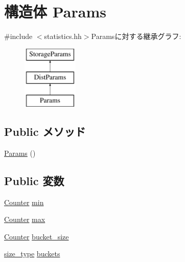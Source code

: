 \hypertarget{structStats_1_1DistStor_1_1Params}{
\section{構造体 Params}
\label{structStats_1_1DistStor_1_1Params}
}


{\ttfamily \#include $<$statistics.hh$>$}Paramsに対する継承グラフ:\begin{figure}[H]
\begin{center}
\leavevmode
\includegraphics[height=3cm]{structStats_1_1DistStor_1_1Params}
\end{center}
\end{figure}
\subsection*{Public メソッド}
\begin{DoxyCompactItemize}
\item 
\hyperlink{structStats_1_1DistStor_1_1Params_a7974597e9d3c848fd265d9445f7cf8cb}{Params} ()
\end{DoxyCompactItemize}
\subsection*{Public 変数}
\begin{DoxyCompactItemize}
\item 
\hyperlink{namespaceStats_ac35128c026c72bb36af9cea00774e8a6}{Counter} \hyperlink{structStats_1_1DistStor_1_1Params_a6205e1c26a829364bc95a93283f20e22}{min}
\item 
\hyperlink{namespaceStats_ac35128c026c72bb36af9cea00774e8a6}{Counter} \hyperlink{structStats_1_1DistStor_1_1Params_af81be55c0ee79705d7fee6179089b184}{max}
\item 
\hyperlink{namespaceStats_ac35128c026c72bb36af9cea00774e8a6}{Counter} \hyperlink{structStats_1_1DistStor_1_1Params_acf3483d9fb89e37ad01724a4428b3dd2}{bucket\_\-size}
\item 
\hyperlink{namespaceStats_ada51e68d31936547d3729c82daf6b7c6}{size\_\-type} \hyperlink{structStats_1_1DistStor_1_1Params_a94003530caa509b59d5355518e0ac58b}{buckets}
\end{DoxyCompactItemize}


